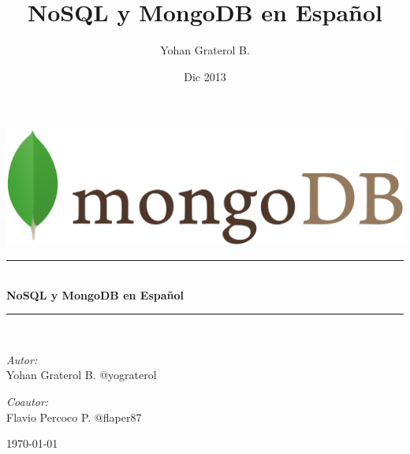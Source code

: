 \documentclass[a4paper, pdftex, 14pt, oneside, titlepage, openany, onecolumn]{book}
\newcommand{\HRule}{\rule{\linewidth}{0.5mm}}
\begin{document}
 
\pagestyle{fancy}
\renewcommand\headrulewidth{0pt}
\setlength{\parskip}{16pt}
\onehalfspace
\lhead{}

\author{Yohan Graterol B.}
\title{NoSQL y MongoDB en Español}
\date{Dic 2013}

\begin{titlepage}
	\begin{center}
		\includegraphics[scale=0.10]{img/mongodb}
		\HRule \\[0.4cm]
		{ \huge \bfseries NoSQL y MongoDB en Español \\[0.4cm] }

		\HRule \\[1.5cm]
		
		\begin{minipage}{0.4\textwidth}
			\begin{flushleft} \large
				\emph{Autor:}\\
				Yohan Graterol B.
				@yograterol
			\end{flushleft}
		\end{minipage}
	    \begin{minipage}{0.4\textwidth}
			\begin{flushright} \large
				\emph{Coautor:}\\
				Flavio Percoco P.
				@flaper87	 
			\end{flushright}
		\end{minipage}

		\vfill

		{\large \today}
	\end{center}
\end{titlepage}

\newpage
\mbox{}
\thispagestyle{empty} 



\tableofcontents









\backmatter
 

\printindex
\end{document}
